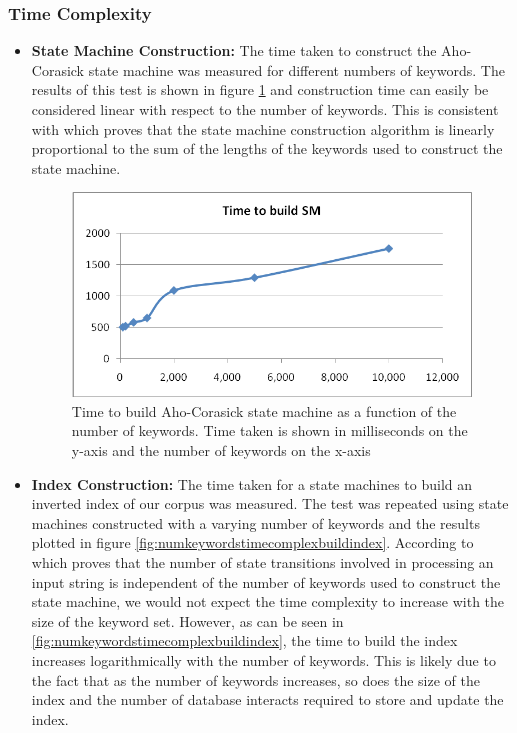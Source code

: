 \documentclass[10pt]{article}
\begin{document}
\subsubsection{Time Complexity}
\begin{itemize}
\item \textbf{State Machine Construction:}
  The time taken to construct the Aho-Corasick state machine was
  measured for different numbers of keywords. The results of this test
  is shown in figure \ref{fig:numkeywordstimecomplexbuildsm} and construction time
  can easily be considered linear with respect to the number of
  keywords. This is consistent with \cite{RefWorks:103} which proves
  that the state machine construction algorithm is linearly
  proportional to the sum of the lengths of the keywords used to
  construct the state machine.

  \begin{figure}[h]
    \begin{center}
      \includegraphics[width=\textwidth,height=!]{numkeywordstimecomplexbuildsm}
    \end{center}
    \caption{Time to build Aho-Corasick state machine as a function of
      the number of keywords. Time taken is shown in milliseconds on the
      y-axis and the number of keywords on the x-axis}
    \label{fig:numkeywordstimecomplexbuildsm}
  \end{figure} 
  
\item \textbf{Index Construction:} 
  The time taken for a state machines to build an inverted index of our
  corpus was measured. The test was repeated using state machines
  constructed with a varying number of keywords and the results plotted
  in figure \ref{fig:numkeywordstimecomplexbuildindex}. According to
  \cite{RefWorks:103} which proves that the number of state transitions
  involved in processing an input string is independent of the number of
  keywords used to construct the state machine, we would not expect the
  time complexity to increase with the size of the keyword set. However,
  as can be seen in \ref{fig:numkeywordstimecomplexbuildindex}, the time
  to build the index increases logarithmically with the number of
  keywords. This is likely due to the fact that as the number of keywords
  increases, so does the size of the index and the number of database
  interacts required to store and update the index.


\end{itemize}
\end{document}

